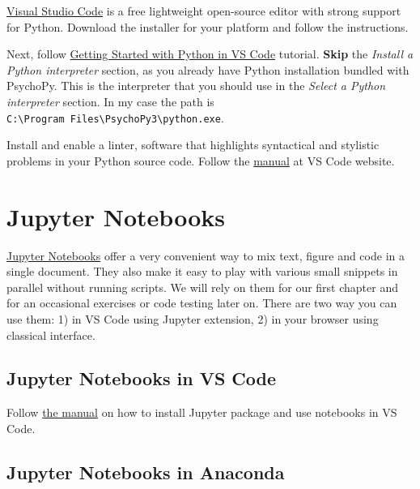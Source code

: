 \documentclass[
]{book}
\begin{document}
\href{https://code.visualstudio.com/}{Visual Studio Code} is a free lightweight open-source editor with strong support for Python. Download the installer for your platform and follow the instructions.

Next, follow \href{https://code.visualstudio.com/docs/python/python-tutorial}{Getting Started with Python in VS Code} tutorial. \textbf{Skip} the \emph{Install a Python interpreter} section, as you already have Python installation bundled with PsychoPy. This is the interpreter that you should use in the \emph{Select a Python interpreter} section. In my case the path is \texttt{C:\textbackslash{}Program\ Files\textbackslash{}PsychoPy3\textbackslash{}python.exe}.

Install and enable a linter, software that highlights syntactical and stylistic problems in your Python source code. Follow the \href{https://code.visualstudio.com/docs/python/linting}{manual} at VS Code website.

\hypertarget{jupyter-notebooks}{%
\section{Jupyter Notebooks}\label{jupyter-notebooks}}

\href{https://jupyter.org/}{Jupyter Notebooks} offer a very convenient way to mix text, figure and code in a single document. They also make it easy to play with various small snippets in parallel without running scripts. We will rely on them for our first chapter and for an occasional exercises or code testing later on. There are two way you can use them: 1) in VS Code using Jupyter extension, 2) in your browser using classical interface.

\hypertarget{jupyter-notebooks-in-vs-code}{%
\subsection{Jupyter Notebooks in VS Code}\label{jupyter-notebooks-in-vs-code}}

Follow \href{https://code.visualstudio.com/docs/datascience/jupyter-notebooks}{the manual} on how to install Jupyter package and use notebooks in VS Code.

\hypertarget{jupyter-notebooks-in-anaconda}{%
\subsection{Jupyter Notebooks in Anaconda}\label{jupyter-notebooks-in-anaconda}}
\end{document}
